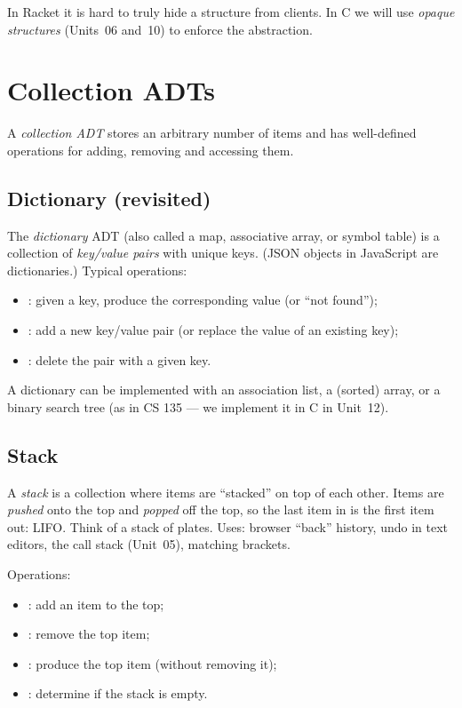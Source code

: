 In Racket it is hard to truly hide a structure from clients. In C we will use \emph{opaque
structures} (Units~06 and~10) to enforce the abstraction.

\section{Collection ADTs}

A \emph{collection ADT} stores an arbitrary number of items and has well-defined operations
for adding, removing and accessing them.

\subsection{Dictionary (revisited)}

The \emph{dictionary} ADT (also called a map, associative array, or symbol table) is a
collection of \emph{key/value pairs} with unique keys. (JSON objects in JavaScript are
dictionaries.) Typical operations:
\begin{itemize}
  \item {}: given a key, produce the corresponding value (or ``not found'');
  \item {}: add a new key/value pair (or replace the value of an existing key);
  \item {}: delete the pair with a given key.
\end{itemize}
A dictionary can be implemented with an association list, a (sorted) array, or a binary search
tree (as in CS 135 --- we implement it in C in Unit~12).

\subsection{Stack}

A \emph{stack} is a collection where items are ``stacked'' on top of each other. Items are
\emph{pushed} onto the top and \emph{popped} off the top, so the last item in is the first item
out: LIFO. Think of a stack of plates. Uses: browser ``back'' history, undo in text editors, the
call stack (Unit~05), matching brackets.

Operations:
\begin{itemize}
  \item {}: add an item to the top;
  \item {}: remove the top item;
  \item {}: produce the top item (without removing it);
  \item {}: determine if the stack is empty.
\end{itemize}

